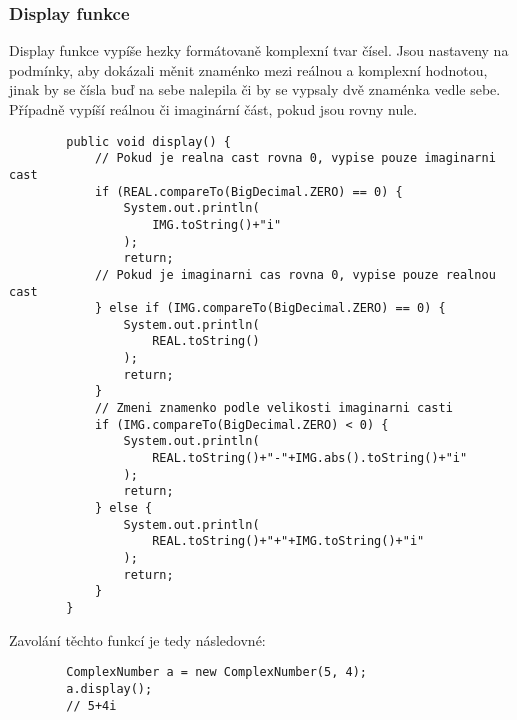 \documentclass{article}
\begin{document}
    \subsubsection{Display funkce}
    Display funkce vypíše hezky formátovaně komplexní tvar čísel. Jsou nastaveny na podmínky, aby dokázali měnit
    znaménko mezi reálnou a komplexní hodnotou, jinak by se čísla buď na sebe nalepila či by se vypsaly dvě znaménka
    vedle sebe. Případně vypíší reálnou či imaginární část, pokud jsou rovny nule.
    \begin{lstlisting}
        public void display() {
            // Pokud je realna cast rovna 0, vypise pouze imaginarni cast
            if (REAL.compareTo(BigDecimal.ZERO) == 0) {
                System.out.println(
                    IMG.toString()+"i"
                );
                return;
            // Pokud je imaginarni cas rovna 0, vypise pouze realnou cast
            } else if (IMG.compareTo(BigDecimal.ZERO) == 0) {
                System.out.println(
                    REAL.toString()
                );
                return;
            }
            // Zmeni znamenko podle velikosti imaginarni casti
            if (IMG.compareTo(BigDecimal.ZERO) < 0) {
                System.out.println(
                    REAL.toString()+"-"+IMG.abs().toString()+"i"
                );
                return;
            } else {
                System.out.println(
                    REAL.toString()+"+"+IMG.toString()+"i"
                );
                return;
            }
        }
    \end{lstlisting}
    Zavolání těchto funkcí je tedy následovné:
    \begin{lstlisting}
        ComplexNumber a = new ComplexNumber(5, 4);
        a.display();
        // 5+4i
    \end{lstlisting}
\end{document}
